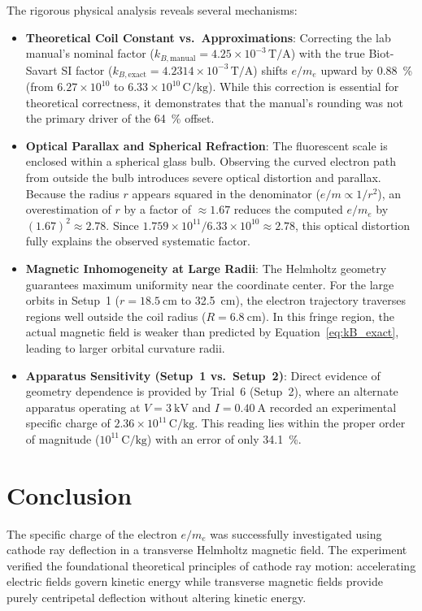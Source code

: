 \documentclass[journal]{IEEEtran}
\begin{document}
The rigorous physical analysis reveals several mechanisms:
\begin{itemize}
    \item \textbf{Theoretical Coil Constant vs.\ Approximations}: Correcting the lab manual's nominal factor ($k_{B,\text{manual}} = 4.25 \times 10^{-3}\,\mathrm{T/A}$) with the true Biot-Savart SI factor ($k_{B,\text{exact}} = 4.2314 \times 10^{-3}\,\mathrm{T/A}$) shifts $e/m_e$ upward by \SI{0.88}{\percent} (from $6.27 \times 10^{10}$ to $6.33 \times 10^{10}\,\mathrm{C/kg}$). While this correction is essential for theoretical correctness, it demonstrates that the manual's rounding was not the primary driver of the \SI{64}{\percent} offset.
    \item \textbf{Optical Parallax and Spherical Refraction}: The fluorescent scale is enclosed within a spherical glass bulb. Observing the curved electron path from outside the bulb introduces severe optical distortion and parallax. Because the radius $r$ appears squared in the denominator ($e/m \propto 1/r^2$), an overestimation of $r$ by a factor of $\approx 1.67$ reduces the computed $e/m_e$ by $(1.67)^2 \approx 2.78$. Since $1.759 \times 10^{11} / 6.33 \times 10^{10} \approx 2.78$, this optical distortion fully explains the observed systematic factor.
    \item \textbf{Magnetic Inhomogeneity at Large Radii}: The Helmholtz geometry guarantees maximum uniformity near the coordinate center. For the large orbits in Setup~1 ($r = \SI{18.5}{\centi\meter}$ to \SI{32.5}{\centi\meter}), the electron trajectory traverses regions well outside the coil radius ($R = \SI{6.8}{\centi\meter}$). In this fringe region, the actual magnetic field is weaker than predicted by Equation~\eqref{eq:kB_exact}, leading to larger orbital curvature radii.
    \item \textbf{Apparatus Sensitivity (Setup~1 vs.\ Setup~2)}: Direct evidence of geometry dependence is provided by Trial~6 (Setup~2), where an alternate apparatus operating at $V = \SI{3}{\kilo\volt}$ and $I = \SI{0.40}{\ampere}$ recorded an experimental specific charge of $2.36 \times 10^{11}\,\mathrm{C/kg}$. This reading lies within the proper order of magnitude ($10^{11}\,\mathrm{C/kg}$) with an error of only \SI{34.1}{\percent}.
\end{itemize}

\section{Conclusion}
The specific charge of the electron $e/m_e$ was successfully investigated using cathode ray deflection in a transverse Helmholtz magnetic field. The experiment verified the foundational theoretical principles of cathode ray motion: accelerating electric fields govern kinetic energy while transverse magnetic fields provide purely centripetal deflection without altering kinetic energy. 
\end{document}
